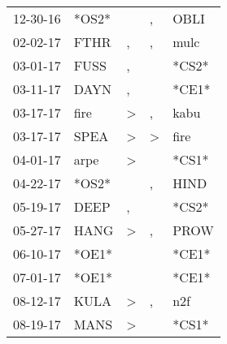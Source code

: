 \begin{supertabular}{p{0.07\textwidth}p{0.06\textwidth}p{0.02\textwidth}p{0.02\textwidth}p{0.06\textwidth}}
          12-30-16\textsuperscript{} &                            *OS2* &                  &                , &           OBLI\textsuperscript{} \\
          02-02-17\textsuperscript{} &           FTHR\textsuperscript{} &                , &                , &           mulc\textsuperscript{} \\
          03-01-17\textsuperscript{} &           FUSS\textsuperscript{} &                , &                  &                            *CS2* \\
          03-11-17\textsuperscript{} &           DAYN\textsuperscript{} &                , &                  &                            *CE1* \\
          03-17-17\textsuperscript{} &           fire\textsuperscript{} &     \textgreater &                , &           kabu\textsuperscript{} \\
          03-17-17\textsuperscript{} &           SPEA\textsuperscript{} &     \textgreater &     \textgreater &           fire\textsuperscript{} \\
          04-01-17\textsuperscript{} &           arpe\textsuperscript{} &     \textgreater &                  &                            *CS1* \\
          04-22-17\textsuperscript{} &                            *OS2* &                  &                , &           HIND\textsuperscript{} \\
          05-19-17\textsuperscript{} &           DEEP\textsuperscript{} &                , &                  &                            *CS2* \\
          05-27-17\textsuperscript{} &           HANG\textsuperscript{} &     \textgreater &                , &           PROW\textsuperscript{} \\
          06-10-17\textsuperscript{} &                            *OE1* &                  &                  &                            *CE1* \\
          07-01-17\textsuperscript{} &                            *OE1* &                  &                  &                            *CE1* \\
          08-12-17\textsuperscript{} &           KULA\textsuperscript{} &     \textgreater &                , &            n2f\textsuperscript{} \\
          08-19-17\textsuperscript{} &           MANS\textsuperscript{} &     \textgreater &                  &                            *CS1* \\

\end{supertabular}
